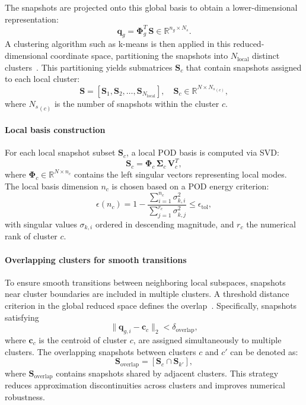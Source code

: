 The snapshots are projected onto this global basis to obtain a lower-dimensional representation:
\begin{equation}
\mathbf{q}_{g} = \boldsymbol{\Phi}_{g}^T\,\mathbf{S}\in\mathbb{R}^{n_g\times N_s}.
\label{eq:global_projection}
\end{equation}
A clustering algorithm such as k-means is then applied in this reduced-dimensional coordinate space, partitioning the snapshots into \(N_{\text{local}}\) distinct clusters~\cite{amsallem2012nonlinear, hastie2009elements}. This partitioning yields submatrices \(\mathbf{S}_c\) that contain snapshots assigned to each local cluster:
\begin{equation}
\mathbf{S} = [\mathbf{S}_1,\mathbf{S}_2,\dotsc,\mathbf{S}_{N_{\text{local}}}],
\quad \mathbf{S}_c \in \mathbb{R}^{N \times {N_s}_{(c)}},
\label{eq:local_snapshot_partition}
\end{equation}
where \({N_s}_{(c)}\) is the number of snapshots within the cluster \(c\).

\paragraph{Local basis construction}
For each local snapshot subset \(\mathbf{S}_c\), a local POD basis is computed via SVD:
\begin{equation}
\mathbf{S}_c = \boldsymbol{\Phi}_c \, \boldsymbol{\Sigma}_c \, \mathbf{V}_c^T,
\label{eq:local_svd}
\end{equation}
where \(\boldsymbol{\Phi}_c\in\mathbb{R}^{N\times n_c}\) contains the left singular vectors representing local modes. The local basis dimension \(n_c\) is chosen based on a POD energy criterion:
\begin{equation}
\epsilon(n_c) = 1 - \frac{\sum_{i=1}^{n_c}\sigma_{k,i}^{2}}{\sum_{j=1}^{r_c}\sigma_{k,j}^{2}} \leq \epsilon_{\text{tol}},
\label{eq:local_pod_energy}
\end{equation}
with singular values \(\sigma_{k,i}\) ordered in descending magnitude, and \(r_c\) the numerical rank of cluster \(c\).

\paragraph{Overlapping clusters for smooth transitions}
To ensure smooth transitions between neighboring local subspaces, snapshots near cluster boundaries are included in multiple clusters. A threshold distance criterion in the global reduced space defines the overlap~\cite{Washabaugh2012}. Specifically, snapshots satisfying
\[
\|\mathbf{q}_{g,i} - \mathbf{c}_c\|_2 < \delta_{\text{overlap}},
\]
where \(\mathbf{c}_c\) is the centroid of cluster \(c\), are assigned simultaneously to multiple clusters. The overlapping snapshots between clusters \(c\) and \(c'\) can be denoted as:
\begin{equation}
\mathbf{S}_{\text{overlap}} = [\mathbf{S}_c \cap \mathbf{S}_{k'}],
\end{equation}
where \(\mathbf{S}_{\text{overlap}}\) contains snapshots shared by adjacent clusters. This strategy reduces approximation discontinuities across clusters and improves numerical robustness.


